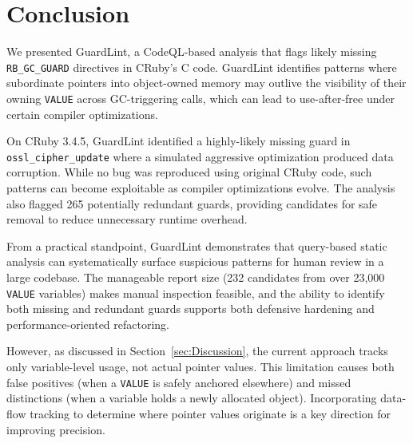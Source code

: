 \section{Conclusion}\label{sec:Conclusion}
We presented GuardLint, a CodeQL-based analysis that flags likely missing \texttt{RB\_GC\_GUARD} directives in CRuby's C code. GuardLint identifies patterns where subordinate pointers into object-owned memory may outlive the visibility of their owning \texttt{VALUE} across GC-triggering calls, which can lead to use-after-free under certain compiler optimizations.

On CRuby 3.4.5, GuardLint identified a highly-likely missing guard in \texttt{ossl\_cipher\_update} where a simulated aggressive optimization produced data corruption. While no bug was reproduced using original CRuby code, such patterns can become exploitable as compiler optimizations evolve. The analysis also flagged 265 potentially redundant guards, providing candidates for safe removal to reduce unnecessary runtime overhead.

From a practical standpoint, GuardLint demonstrates that query-based static analysis can systematically surface suspicious patterns for human review in a large codebase. The manageable report size (232 candidates from over 23{,}000 \texttt{VALUE} variables) makes manual inspection feasible, and the ability to identify both missing and redundant guards supports both defensive hardening and performance-oriented refactoring.

However, as discussed in Section~\ref{sec:Discussion}, the current approach tracks only variable-level usage, not actual pointer values. This limitation causes both false positives (when a \texttt{VALUE} is safely anchored elsewhere) and missed distinctions (when a variable holds a newly allocated object). Incorporating data-flow tracking to determine where pointer values originate is a key direction for improving precision.
